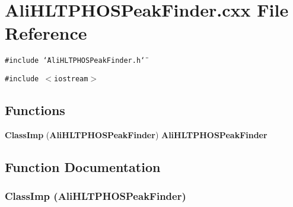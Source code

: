 \section{Ali\-HLTPHOSPeak\-Finder.cxx File Reference}
\label{AliHLTPHOSPeakFinder_8cxx}
{\tt \#include \char`\"{}Ali\-HLTPHOSPeak\-Finder.h\char`\"{}}\par
{\tt \#include $<$iostream$>$}\par
\subsection*{Functions}
\begin{CompactItemize}
\item 
{\bf Class\-Imp} ({\bf Ali\-HLTPHOSPeak\-Finder}) {\bf Ali\-HLTPHOSPeak\-Finder}
\end{CompactItemize}


\subsection{Function Documentation}
\subsubsection{\setlength{\rightskip}{0pt plus 5cm}Class\-Imp ({\bf Ali\-HLTPHOSPeak\-Finder})}\label{AliHLTPHOSPeakFinder_8cxx_a0}


